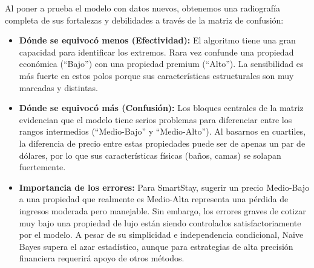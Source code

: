 \documentclass[
]{article}
\providecommand{\tightlist}{%
  \setlength{\itemsep}{0pt}\setlength{\parskip}{0pt}}
\begin{document}
Al poner a prueba el modelo con datos nuevos, obtenemos una radiografía
completa de sus fortalezas y debilidades a través de la matriz de
confusión:

\begin{itemize}
\tightlist
\item
  \textbf{Dónde se equivocó menos (Efectividad):} El algoritmo tiene una
  gran capacidad para identificar los extremos. Rara vez confunde una
  propiedad económica (``Bajo'') con una propiedad premium (``Alto'').
  La sensibilidad es más fuerte en estos polos porque sus
  características estructurales son muy marcadas y distintas.
\item
  \textbf{Dónde se equivocó más (Confusión):} Los bloques centrales de
  la matriz evidencian que el modelo tiene serios problemas para
  diferenciar entre los rangos intermedios (``Medio-Bajo'' y
  ``Medio-Alto''). Al basarnos en cuartiles, la diferencia de precio
  entre estas propiedades puede ser de apenas un par de dólares, por lo
  que sus características físicas (baños, camas) se solapan fuertemente.
\item
  \textbf{Importancia de los errores:} Para SmartStay, sugerir un precio
  Medio-Bajo a una propiedad que realmente es Medio-Alta representa una
  pérdida de ingresos moderada pero manejable. Sin embargo, los errores
  graves de cotizar muy bajo una propiedad de lujo están siendo
  controlados satisfactoriamente por el modelo. A pesar de su
  simplicidad e independencia condicional, Naive Bayes supera el azar
  estadístico, aunque para estrategias de alta precisión financiera
  requerirá apoyo de otros métodos.
\end{itemize}
\end{document}
